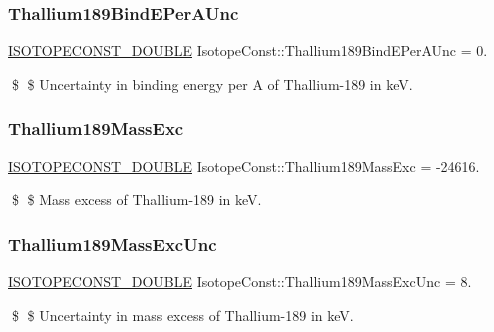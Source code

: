 \subsubsection{\texorpdfstring{Thallium189\+Bind\+E\+Per\+A\+Unc}{Thallium189BindEPerAUnc}}
{\footnotesize\ttfamily \mbox{\hyperlink{group___isotope_const-_macros_ga8f45a7272ce02c0b4c65c44636ed719a}{I\+S\+O\+T\+O\+P\+E\+C\+O\+N\+S\+T\+\_\+\+D\+O\+U\+B\+LE}} Isotope\+Const\+::\+Thallium189\+Bind\+E\+Per\+A\+Unc = 0.}

\$ \$ Uncertainty in binding energy per A of Thallium-\/189 in keV. \mbox{\label{group___isotope_const-_thallium-_tl189_ga1e8c0b94bb70b954f89870225df2fbbf}} 
\subsubsection{\texorpdfstring{Thallium189\+Mass\+Exc}{Thallium189MassExc}}
{\footnotesize\ttfamily \mbox{\hyperlink{group___isotope_const-_macros_ga8f45a7272ce02c0b4c65c44636ed719a}{I\+S\+O\+T\+O\+P\+E\+C\+O\+N\+S\+T\+\_\+\+D\+O\+U\+B\+LE}} Isotope\+Const\+::\+Thallium189\+Mass\+Exc = -\/24616.}

\$ \$ Mass excess of Thallium-\/189 in keV. \mbox{\label{group___isotope_const-_thallium-_tl189_ga25afccf72c84235295c44cad45a1d4ac}} 
\subsubsection{\texorpdfstring{Thallium189\+Mass\+Exc\+Unc}{Thallium189MassExcUnc}}
{\footnotesize\ttfamily \mbox{\hyperlink{group___isotope_const-_macros_ga8f45a7272ce02c0b4c65c44636ed719a}{I\+S\+O\+T\+O\+P\+E\+C\+O\+N\+S\+T\+\_\+\+D\+O\+U\+B\+LE}} Isotope\+Const\+::\+Thallium189\+Mass\+Exc\+Unc = 8.}

\$ \$ Uncertainty in mass excess of Thallium-\/189 in keV. \mbox{\label{group___isotope_const-_thallium-_tl189_ga93f78c740e004d7b0ff4c0933b0ea2aa}} 
